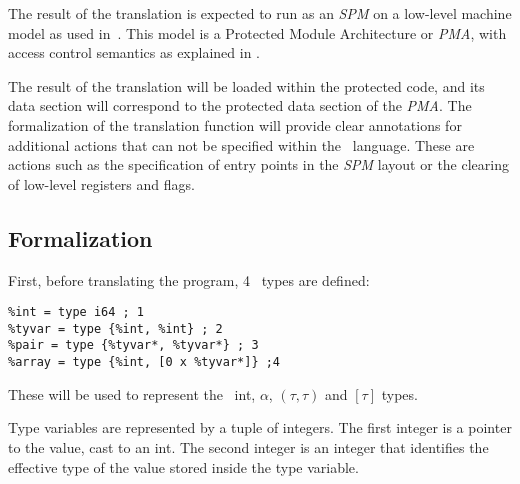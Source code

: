 The result of the translation is expected to run as an \emph{SPM} on a low-level machine model as used in~\cite{Agten:2012:SCM:2354412.2355247,Patrignani}.
This model is a Protected Module Architecture or \emph{PMA}, with access control semantics as explained in .


%
The result of the translation will be loaded within the protected code, and its data section will correspond to the protected data section of the \emph{PMA}.
The formalization of the translation function \cmath{\compile{\bullet}} will provide clear annotations for additional actions that can not be specified within the \LLVMIR\ language.
These are actions such as the specification of entry points in the \emph{SPM} layout or the clearing of low-level registers and flags.

\subsection{Formalization}
First, before translating the program, 4 \LLVMIR\ types are defined:
\begin{lstlisting}
%int = type i64 ; 1
%tyvar = type {%int, %int} ; 2
%pair = type {%tyvar*, %tyvar*} ; 3
%array = type {%int, [0 x %tyvar*]} ;4
\end{lstlisting}
These will be used to represent the \MiniML\ int, $\alpha$, $(\tau,\tau)$ and $[\tau]$ types.

Type variables are represented by a tuple of integers.
The first integer is a pointer to the value, cast to an int.
The second integer is an integer that identifies the effective type of the value stored inside the type variable.


